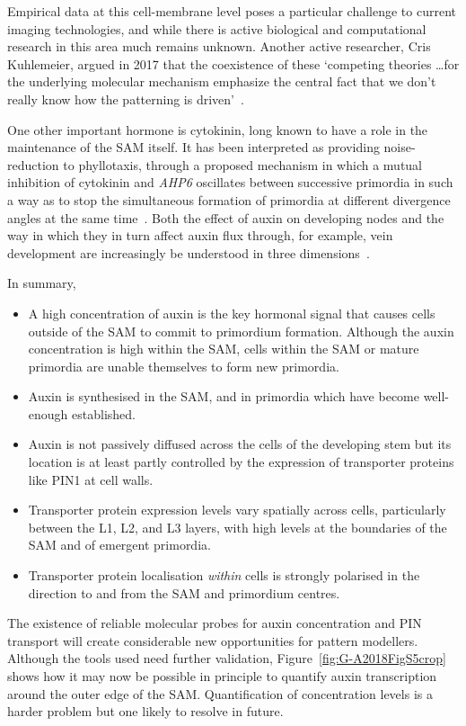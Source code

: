 Empirical data at this cell-membrane level poses a particular challenge  to current imaging technologies, and while there is active biological and computational research in this area much remains unknown. Another active researcher, Cris Kuhlemeier,  argued in 2017 that the coexistence of these `competing theories \ldots  for the underlying molecular mechanism emphasize the central fact that we don't really know how the patterning is driven'~\autocite{kuhlemeierPhyllotaxis2017}. 


One other important hormone is cytokinin, long known to have a role in the maintenance of the SAM itself.
It has been interpreted as providing noise-reduction to phyllotaxis, through a proposed mechanism in which a mutual inhibition of cytokinin and \textit{AHP6} oscillates between successive primordia in such a way as to stop the simultaneous formation of primordia at different divergence angles at the same time~\cite{besnardCytokininSignallingInhibitory2014}. Both the effect of auxin on developing nodes and the way in which they in turn affect auxin flux through, for example, vein development are increasingly  be understood in three dimensions~\autocite{debPhyllotaxisInvolvesAuxin2015}.


In summary,
\begin{itemize}
	\item A high concentration of auxin is the key hormonal signal that causes cells  outside of the SAM to commit to primordium formation. Although the auxin concentration is high within the SAM, cells within the SAM or mature primordia are unable themselves to form new primordia.  
	\item Auxin is synthesised in the SAM, and in primordia which have become well-enough established. 
	\item Auxin is not passively diffused across the cells of the developing stem but its location is at least partly controlled by the expression of transporter proteins like PIN1 at cell walls.
	\item Transporter protein expression levels vary spatially across cells, particularly between the L1, L2, and L3 layers, with high levels at the boundaries of the SAM and of emergent primordia. 
	\item Transporter protein localisation \textit{within} cells is strongly polarised in the direction to and from the SAM and primordium centres.
\end{itemize}

 
The existence of reliable molecular probes for auxin concentration and PIN transport will create considerable new opportunities for pattern modellers. Although the tools used need further validation,  Figure~\ref{fig:G-A2018FigS5crop} shows how it may now be possible in principle to quantify auxin transcription around the outer edge of the SAM. Quantification of concentration levels is a harder problem but one likely to resolve in future. %

